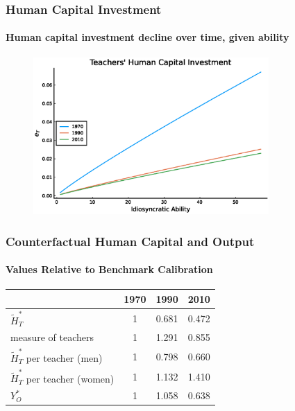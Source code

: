 \documentclass[11pt]{beamer}
\begin{document}
\begin{frame}
\frametitle{Human Capital Investment}
\framesubtitle{Human capital investment decline over time, given ability}
\begin{figure}
 		\begin{center}
 			\includegraphics[width=0.8\textwidth]{plots/counterfactuals/counter_1/eT_steadystate.eps}
 			\label{ }
 		\end{center}
 	\end{figure}
\end{frame}


\begin{frame}
\frametitle{Counterfactual Human Capital and Output}
\framesubtitle{Values Relative to Benchmark Calibration}
\begin{table}
  \centering \begin{tabular}{lccc}
\toprule
& 1970 & 1990 & 2010 \\
\midrule
$\widetilde{H}_T^*$ & 1  & 0.681 & 0.472 \\
measure of teachers & 1 & 1.291 & 0.855\\
$\widetilde{H}_T^*$ per teacher (men)   & 1 & 0.798 & 0.660 \\
$\widetilde{H}_T^*$ per teacher (women)   & 1 & 1.132 &  1.410\\
$Y_O^*$ & 1 & 1.058 & 0.638 \\
\bottomrule
\end{tabular}
  \label{ }
\end{table}


\end{frame}
\end{document}
